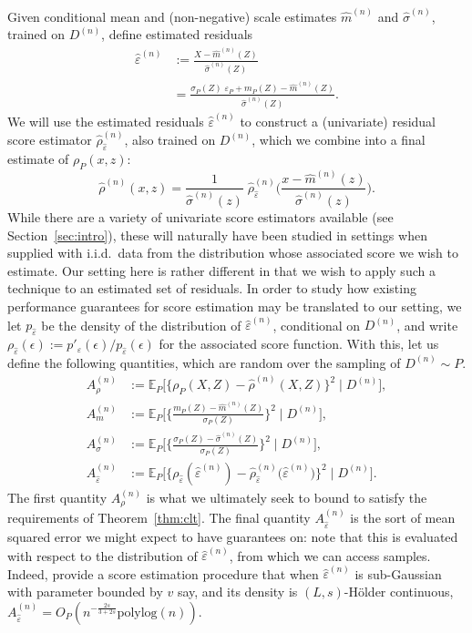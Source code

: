 \documentclass[aos]{imsart}
\newcommand{\E}{\mathbb{E}}
\begin{document}
	Given conditional mean and (non-negative) scale estimates $\hat m^{(n)}$ and $\hat\sigma^{(n)}$,
	trained on $D^{(n)}$,
	define estimated residuals
	\begin{align*}
		\hat\varepsilon^{(n)} &:= \frac{X-\hat m^{(n)}(Z)}{\hat\sigma^{(n)}(Z)}\\
		&= \frac{\sigma_P(Z)\;\varepsilon_P+m_P(Z)-\hat m^{(n)}(Z)}{\hat\sigma^{(n)}(Z)}.
	\end{align*}
We will use the estimated residuals $\hat\varepsilon^{(n)}$ to construct a (univariate) residual score estimator $\hat \rho^{(n)}_{\hat\varepsilon}$, also
trained on $D^{(n)}$, which we combine into  a final estimate of $\rho_P(x,z)$:
\begin{equation} \label{eq:rho_est}
	\hat\rho^{(n)}(x,z) = \frac{1}{\hat \sigma^{(n)}(z)}\; \hat \rho_{\hat\varepsilon}^{(n)}\bigg(\frac{x-\hat m^{(n)}(z)}{\hat\sigma^{(n)}(z)}\bigg).
\end{equation}
While there are a variety of univariate score estimators available (see Section~\ref{sec:intro}), these will naturally have been studied in settings when supplied with  i.i.d.\ data from the distribution whose associated score we wish to estimate. Our setting here is rather  different in that we  wish to apply such a technique to an estimated set of residuals. In order to study how existing performance guarantees for score estimation may be translated to our setting, we let $p_{\hat{\varepsilon}}$ be the density of the distribution of $\hat\varepsilon^{(n)}$, conditional on $D^{(n)}$, and write $\rho_{\hat{\varepsilon}}(\epsilon) := p'_{\hat{\varepsilon}}(\epsilon) / p_{\hat{\varepsilon}}(\epsilon)$ for the associated score function. With this, let us define the following quantities,
	which are random over the sampling of $D^{(n)}\sim P$.
\begin{align*}
	A_\rho^{(n)} &:= \E_P\Big[\big\{\rho_{P}(X,Z)-\hat \rho^{(n)}(X,Z)\big\}^2 \; \Big| \; D^{(n)}\Big],\\
	A_m^{(n)} &:= \E_P\Bigg[\bigg\{\frac{m_P(Z) - \hat m^{(n)}(Z)}{\sigma_P(Z)}\bigg\}^2 \;\Bigg|\; D^{(n)}\Bigg],\\
	A_\sigma^{(n)} &:= \E_P\Bigg[\bigg\{\frac{\sigma_P(Z) - \hat \sigma^{(n)}(Z)}{\sigma_P(Z)}\bigg\}^2 \;\Bigg|\; D^{(n)}\Bigg],\\
	A_{\hat\varepsilon}^{(n)} &:= \E_P\Big[\big\{\rho_{\hat\varepsilon}(\hat\varepsilon^{(n)}) - \hat\rho_{\hat\varepsilon}^{(n)}\big(\hat\varepsilon^{(n)}\big)\big\}^2\;\Big|\; D^{(n)}\Big].
\end{align*}
The first quantity $A_\rho^{(n)}$ is what we ultimately seek to bound to satisfy the requirements of Theorem~\ref{thm:clt}. The final quantity $A_{\hat\varepsilon}^{(n)}$ is the sort of mean squared error we might expect to have guarantees on: note that this is evaluated with respect to the distribution of $\hat\varepsilon^{(n)}$, from which we can access samples. Indeed, \citet{wibisono2024optimal} provide a score estimation procedure that when $\hat{\varepsilon}^{(n)}$ is sub-Gaussian with parameter bounded by $v$ say, and its density is $(L, s)$-H\"older continuous,  $A_{\hat\varepsilon}^{(n)} = O_P(n^{-\frac{2s}{3+2s}} \text{polylog}(n))$.
\end{document}
